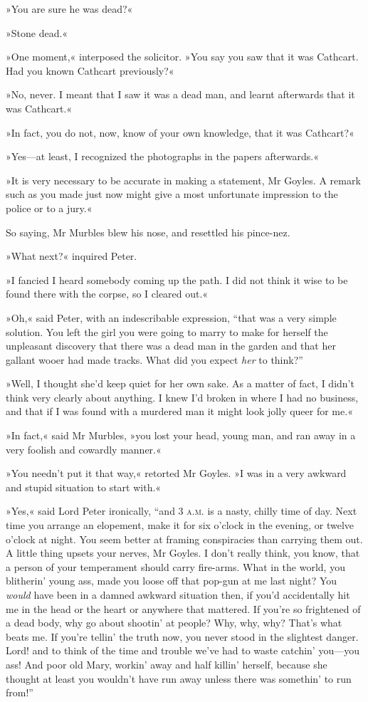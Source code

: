 »You are sure he was dead?«

»Stone dead.«

»One moment,« interposed the solicitor. »You say you saw that it was Cathcart. Had you known Cathcart previously?«

»No, never. I meant that I saw it was a dead man, and learnt afterwards that it was Cathcart.«

»In fact, you do not, now, know of your own knowledge, that it was Cathcart?«

»Yes\allowbreak---\allowbreak at least, I recognized the photographs in the papers afterwards.«

»It is very necessary to be accurate in making a statement, Mr Goyles.  A remark such as you made just now might give a most unfortunate impression to the police or to a jury.«

So saying, Mr Murbles blew his nose, and resettled his pince-nez.

»What next?« inquired Peter.

»I fancied I heard somebody coming up the path. I did not think it wise to be found there with the corpse, so I cleared out.«

»Oh,« said Peter, with an indescribable expression, \enquote{that was a very simple solution. You left the girl you were going to marry to make for herself the unpleasant discovery that there was a dead man in the garden and that her gallant wooer had made tracks. What did you expect \textit{her} to think?}

»Well, I thought she'd keep quiet for her own sake. As a matter of fact, I didn't think very clearly about anything. I knew I'd broken in where I had no business, and that if I was found with a murdered man it might look jolly queer for me.«

»In fact,« said Mr Murbles, »you lost your head, young man, and ran away in a very foolish and cowardly manner.«

»You needn't put it that way,« retorted Mr Goyles. »I was in a very awkward and stupid situation to start with.«

»Yes,« said Lord Peter ironically, \enquote{and 3 \textsc{a.m.} is a nasty, chilly time of day. Next time you arrange an elopement, make it for six o'clock in the evening, or twelve o'clock at night. You seem better at framing conspiracies than carrying them out. A little thing upsets your nerves, Mr Goyles. I don't really think, you know, that a person of your temperament should carry fire-arms. What in the world, you blitherin' young ass, made you loose off that pop-gun at me last night? You \textit{would} have been in a damned awkward situation then, if you'd accidentally hit me in the head or the heart or anywhere that mattered. If you're so frightened of a dead body, why go about shootin' at people? Why, why, why? That's what beats me. If you're tellin' the truth now, you never stood in the slightest danger. Lord! and to think of the time and trouble we've had to waste catchin' you\allowbreak---\allowbreak you ass! And poor old Mary, workin' away and half killin' herself, because she thought at least you wouldn't have run away unless there was somethin' to run from!}

